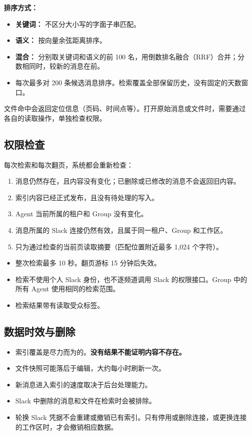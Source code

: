 \documentclass[UTF8,a4paper,11pt]{ctexart}
\begin{document}
\textbf{排序方式：}

\begin{itemize}
  \item \textbf{关键词：} 不区分大小写的字面子串匹配。
  \item \textbf{语义：} 按向量余弦距离排序。
  \item \textbf{混合：} 分别取关键词和语义的前 100 名，用倒数排名融合（RRF）合并；分数相同时，较新的消息在前。
  \item 每次最多对 200 条候选消息排序。检索覆盖全部保留历史，没有固定的天数窗口。
\end{itemize}

文件命中会返回定位信息（页码、时间点等）。打开原始消息或文件时，需要通过各自的读取操作，单独检查权限。

\subsection{权限检查}

每次检索和每次翻页，系统都会重新检查：

\begin{enumerate}
  \item 消息仍然存在，且内容没有变化；已删除或已修改的消息不会返回旧内容。
  \item 索引内容已经正式发布，且没有待处理的写入。
  \item Agent 当前所属的租户和 Group 没有变化。
  \item 消息所属的 Slack 连接仍然有效，且属于同一租户、Group 和工作区。
  \item 只为通过检查的当前页读取摘要（匹配位置附近最多 1,024 个字符）。
\end{enumerate}

\begin{itemize}
  \item 整次检索最多 10 秒。翻页游标 15 分钟后失效。
  \item 检索不使用个人 Slack 身份，也不逐频道调用 Slack 的权限接口。Group 中的所有 Agent 使用相同的检索范围。
  \item 检索结果带有读取受众标签。
\end{itemize}

\subsection{数据时效与删除}

\begin{itemize}
  \item 索引覆盖是尽力而为的。\textbf{没有结果不能证明内容不存在。}
  \item 文件快照可能落后于编辑，大约每小时刷新一次。
  \item 新消息进入索引的速度取决于后台处理能力。
  \item Slack 中删除的消息和文件在检索时会被排除。
  \item 轮换 Slack 凭据不会重建或撤销已有索引。只有停用或删除连接，或更换连接的工作区时，才会撤销相应数据。
\end{itemize}
\end{document}
